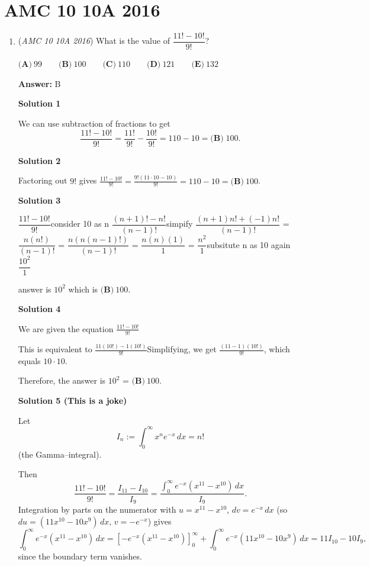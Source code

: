 \section{AMC 10 10A 2016}
        \begin{enumerate}
        	\item (\textit{AMC 10 10A 2016}) What is the value of $\dfrac{11!-10!}{9!}$?


 $\textbf{(A)}\ 99\qquad\textbf{(B)}\ 100\qquad\textbf{(C)}\ 110\qquad\textbf{(D)}\ 121\qquad\textbf{(E)}\ 132$

 \textbf{Answer: }B



\textbf{Solution 1}

We can use subtraction of fractions to get 
 \[\frac{11!-10!}{9!} = \frac{11!}{9!} - \frac{10!}{9!} = 110 -10 = \boxed{\textbf{(B)}\;100}.\]




\textbf{Solution 2}

Factoring out $9!$ gives $\frac{11!-10!}{9!} = \frac{9!(11 \cdot 10 - 10)}{9!} = 110-10=\boxed{\textbf{(B)}~100}$.

 


 



\textbf{Solution 3}

$\dfrac{11!-10!}{9!}$consider 10 as n $\dfrac{(n+1)!-n!}{(n-1)!}$simpify $\dfrac{(n+1)n!+(-1)n!}{(n-1)!}$ = $\dfrac{n(n!)}{(n-1)!}$ = $\dfrac{n(n(n-1)!)}{(n-1)!}$ = $\dfrac{n(n)(1)}{1}$ = $\dfrac{n^2}{1}$subsitute n as 10 again  $\dfrac{10^2}{1}$

 answer is $10^2$ which is $\boxed{\textbf{(B)}~100}$.

 



\textbf{Solution 4}

We are given the equation $\frac{11!-10!}{9!}$

 This is equivalent to $\frac{11(10!) - 1(10!)}{9!}$Simplifying, we get $\frac{(11-1)(10!)}{9!}$, which equals $10 \cdot 10$.

 Therefore, the answer is $10^2$ = $\boxed{\textbf{(B)}~100}$.

 



\textbf{Solution 5 (This is a joke)}

Let
 \[I_n := \int_0^\infty x^n e^{-x} \, dx = n!\](the Gamma–integral).

 Then
 \[\frac{11! - 10!}{9!} = \frac{I_{11} - I_{10}}{I_9} = \frac{\int_0^\infty e^{-x} (x^{11} - x^{10}) \, dx}{I_9}.\]Integration by parts on the numerator with \( u = x^{11} - x^{10} \), \( dv = e^{-x} \, dx \) (so \( du = (11x^{10} - 10x^9) \, dx \), \( v = -e^{-x} \)) gives
 \[\int_0^\infty e^{-x} (x^{11} - x^{10}) \, dx = \left[ -e^{-x} (x^{11} - x^{10}) \right]_0^\infty + \int_0^\infty e^{-x} (11x^{10} - 10x^9) \, dx = 11 I_{10} - 10 I_9,\]since the boundary term vanishes.


\end{enumerate}
